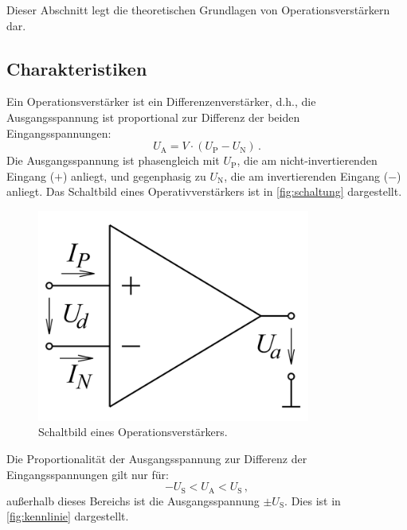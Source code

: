  
\noindent
Dieser Abschnitt legt die theoretischen Grundlagen von Operationsverstärkern dar.

\subsection{Charakteristiken}

\noindent 
Ein Operationsverstärker ist ein Differenzenverstärker, d.h., die Ausgangsspannung ist proportional zur Differenz der beiden Eingangsspannungen:
\begin{equation*}
    U_\text{A} = V \cdot \left( U_\text{P} - U_\text{N}\right)\, .
\end{equation*}
Die Ausgangsspannung ist phasengleich mit $U_\text{P}$, die am nicht-invertierenden Eingang ($+$) anliegt, und gegenphasig zu $U_\text{N}$, die am invertierenden Eingang ($-$) anliegt. Das Schaltbild eines Operativverstärkers ist in \autoref{fig:schaltung} dargestellt.

\begin{figure}%
    \centering%
    \includegraphics[width=0.8\textwidth]{Bilder/OpAmp.png}%
    \caption{Schaltbild eines Operationsverstärkers.\cite{OpAmp1}}%
    \label{fig:schaltung}%
\end{figure}%

Die Proportionalität der Ausgangsspannung zur Differenz der Eingangsspannungen gilt nur für:
\begin{equation*}
    - U_\text{S} < U_\text{A} < U_\text{S}\, ,
\end{equation*}
außerhalb dieses Bereichs ist die Ausgangsspannung $\pm U_\text{S}$. Dies ist in \autoref{fig:kennlinie} dargestellt.

